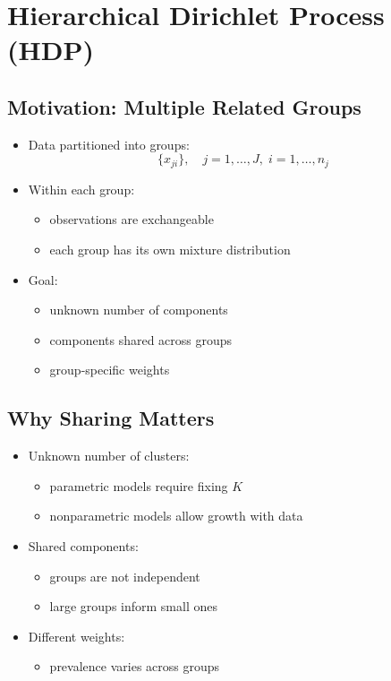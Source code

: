 \documentclass[12pt,oneside]{book}
\numberwithin{equation}{section}
\theoremstyle{definition}
\theoremstyle{plain}
\theoremstyle{remark}
\begin{document}
\section{Hierarchical Dirichlet Process (HDP)}

\subsection*{Motivation: Multiple Related Groups}

\begin{itemize}
\item Data partitioned into groups:
\[
\{x_{ji}\}, \quad j=1,\dots,J,\; i=1,\dots,n_j
\]

\item Within each group:
\begin{itemize}
\item observations are exchangeable
\item each group has its own mixture distribution
\end{itemize}

\item Goal:
\begin{itemize}
\item unknown number of components
\item components shared across groups
\item group-specific weights
\end{itemize}
\end{itemize}

\subsection*{Why Sharing Matters}

\begin{itemize}
\item Unknown number of clusters:
\begin{itemize}
\item parametric models require fixing $K$
\item nonparametric models allow growth with data
\end{itemize}

\item Shared components:
\begin{itemize}
\item groups are not independent
\item large groups inform small ones
\end{itemize}

\item Different weights:
\begin{itemize}
\item prevalence varies across groups
\end{itemize}
\end{itemize}
\end{document}
